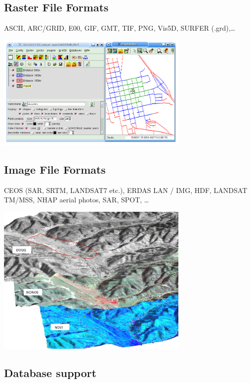 \documentclass[notumble,a4paper,10pt,nofoldmark]{leaflet}
\newenvironment{myfig}[1][0pt plus 1.5ex minus .5ex]{\par\vspace*{#1}\begin{minipage}{\textwidth}\centering}{\end{minipage}}
\begin{document}
\subsection{Raster File Formats}
ASCII, ARC/GRID, E00, GIF, GMT, TIF, PNG, Vis5D, SURFER (.grd),\dots
\begin{myfig}
\includegraphics[width=0.7\textwidth]{isodist}
\end{myfig}

\subsection{Image File Formats}

CEOS (SAR, SRTM, LANDSAT7 etc.), ERDAS LAN / IMG, HDF, LANDSAT TM/MSS, NHAP aerial photos, SAR, SPOT, \dots
\begin{myfig}[1.5ex]
\includegraphics[width=0.7\textwidth]{ndvi}
\end{myfig}

\subsection{Database support}
\end{document}
